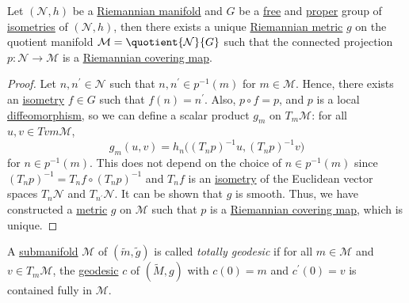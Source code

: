 \begin{proposition}
	Let \((\mathcal{N}, h )\) be a \hyperref[def:Riemannian-manifold]{Riemannian manifold} and \(G\) be a \href{https://en.wikipedia.org/wiki/Free_group}{free} and \href{https://mathworld.wolfram.com/ProperGroupAction.html}{proper} group of \hyperref[def:isometry]{isometries} of \((\mathcal{N} , h)\), then there exists a unique \hyperref[def:Riemannian-metric]{Riemannian metric} \(g\) on the quotient manifold \(\mathcal{M} = \quotient{\mathcal{N} }{G} \) such that the connected projection \(p\colon \mathcal{N}  \to  \mathcal{M} \) is a \hyperref[def:Riemannian-covering-map]{Riemannian covering map}.
\end{proposition}
\begin{proof}
	Let \(n, n^\prime \in \mathcal{N} \) such that \(n, n^\prime \in p ^{-1} (m)\) for \(m\in \mathcal{M} \). Hence, there exists an \hyperref[def:isometry]{isometry} \(f\in G\) such that \(f(n) = n^\prime \). Also, \(p \circ f = p\), and \(p\) is a local \hyperref[def:diffeomorphism]{diffeomorphism}, so we can define a scalar product \(g_m\) on \(T_m \mathcal{M} \): for all \(u, v\in Tvm \mathcal{M} \),
	\[
		g_m(u, v) = h_n\big( (T_n p)^{-1} u, (T_n p)^{-1} v\big)
	\]
	for \(n\in p ^{-1} (m)\). This does not depend on the choice of \(n\in p ^{-1} (m)\) since \((T_n p)^{-1} = T_n f \circ (T_n p)^{-1} \) and \(T_n f\) is an \hyperref[def:isometry]{isometry} of the Euclidean vector spaces  \(T_n \mathcal{N} \) and \(T_{n^\prime } \mathcal{N} \). It can be shown that \(g\) is smooth. Thus, we have constructed a \hyperref[def:Riemannian-metric]{metric} \(g\) on \(\mathcal{M} \) such that \(p\) is a \hyperref[def:Riemannian-covering-map]{Riemannian covering map}, which is unique.
\end{proof}

\begin{definition}\label{def:totally-geodesic}
	A \hyperref[def:submanifold]{submanifold} \(\mathcal{M} \) of \((\widetilde{m} , \widetilde{g} )\) is called \emph{totally geodesic} if for all \(m\in \mathcal{M} \) and \(v\in T_m \mathcal{M} \), the \hyperref[def:geodesic]{geodesic} \(c\) of \((\widetilde{M}, g)\) with \(c(0) = m\) and \(c^\prime (0) = v\) is contained fully in \(\mathcal{M} \).
\end{definition}

